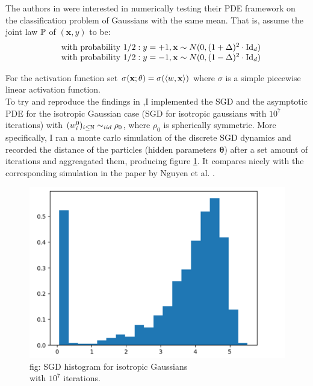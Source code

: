 \documentclass{article}
\begin{document}
The authors in \cite{Mei_2018} were interested in numerically testing their PDE framework on the classification problem of Gaussians with the same mean. That is, assume the joint law $ \mathbb{P}$ of $(\mathbf{x}, y) $ to be:
\begin{equation}
\begin{array}{cc}
& \text{with probability }  1/2: y = +1, \mathbf{x}\sim N(0, (1+\Delta)^{2}\cdot\operatorname{Id}_{d})\\
& \text{with probability } 1/2: y = -1, \mathbf{x}\sim N(0, (1-\Delta)^{2}\cdot\operatorname{Id}_{d})
\end{array}
\end{equation}

For the activation function set $ \sigma( \mathbf{x}; \mathbf{\theta}) = \sigma(\langle w,  \mathbf{x}\rangle)$ where $ \sigma$ is a simple piecewise linear activation function.\\

To try and reproduce the findings in \cite{Mei_2018},I implemented the SGD and the asymptotic PDE for the isotropic Gaussian case (SGD for isotropic gaussians with $10^7$ iterations) with $(w_i^0 )_{i\leq\mathbb{N}} \sim_{iid} \rho_0$, where $\rho_0$ is spherically symmetric. More specifically, I ran a monte carlo simulation of the discrete SGD dynamics and recorded the distance of the particles (hidden parameters $ \mathbf{\theta}$) after a set amount of iterations and aggreagated them, producing figure \ref{fig: SGD histogram isotropic Gaussians}. It compares nicely with the corresponding simulation in the paper  by Nguyen et al. \cite{Mei_2018}. 

\begin{figure}[H]    
\centering
  \includegraphics[width=0.8\linewidth]{ images/Nguyen2018-SGD-1.png}
  \caption{fig: SGD histogram for isotropic Gaussians\\ with $ 10^{7}$ iterations.}
  \label{fig: SGD histogram isotropic Gaussians}
\end{figure}
\end{document}
